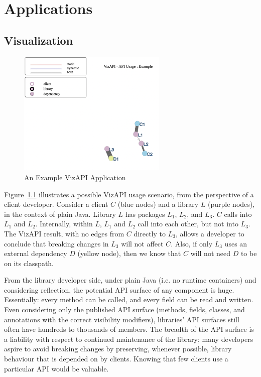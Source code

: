\chapter{Applications}
\section{Visualization}
\label{sec:visualization}

\begin{figure}[h]
\begin{center}
\includegraphics[height=6cm]{images/intro-example.png}
\caption{An Example VizAPI Application}
\label{fig:example}
\end{center}
\end{figure}


Figure~\ref{fig:example} illustrates a possible VizAPI usage scenario, from the perspective of a client developer. Consider a client $C$ (blue nodes) and a library $L$ (purple nodes), in the context of plain Java. Library $L$ has packages $L_1$, $L_2$, and $L_3$. $C$ calls into $L_1$ and $L_2$. Internally, within $L$, $L_1$ and $L_2$ call into each other, but not into $L_3$. The VizAPI result, with no edges from $C$ directly to $L_3$, allows a developer to conclude that breaking changes in $L_3$ will not affect $C$. Also, if only $L_3$ uses an external dependency $D$ (yellow node), then we know that $C$ will not need $D$ to be on its classpath.

From the library developer side, under plain Java (i.e. no runtime containers) and considering reflection, the potential API surface of any component is huge. Essentially: every method can be called, and every field can be read and written. Even considering only the published API surface (methods, fields, classes, and annotations with the correct visibility modifiers), libraries' API surfaces still often have hundreds to thousands of members. The breadth of the API surface is a liability with respect to continued maintenance of the library; many developers aspire to avoid breaking changes by preserving, whenever possible, library behaviour that is depended on by clients. Knowing that few clients use a particular API would be valuable.

